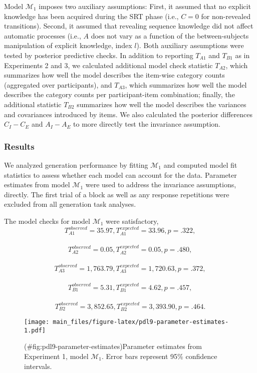 \begin{appendix}
Model \(\mathcal{M}_1\) imposes two auxiliary assumptions: First, it
assumed that no explicit knowledge has been acquired during the SRT
phase (i.e., \(C=0\) for non-revealed transitions). Second, it assumed
that revealing sequence knowledge did not affect automatic processes
(i.e., \(A\) does not vary as a function of the between-subjects
manipulation of explicit knowledge, index \(l\)). Both auxiliary
assumptions were tested by posterior predictive checks. In addition to
reporting \(T_{A1}\) and \(T_{B1}\) as in Experiments 2 and 3, we
calculated additional model check statistic \(T_{A2}\), which summarizes
how well the model describes the item-wise category counts (aggregated
over participants), and \(T_{A3}\), which summarizes how well the model
describes the category counts per participant-item combination; finally,
the additional statistic \(T_{B2}\) summarizes how well the model
describes the variances and covariances introduced by items. We also
calculated the posterior differences \(C_I - C_E\) and \(A_I - A_E\) to
more directly test the invariance assumption.

\subsubsection{Results}\label{results}

We analyzed generation performance by fitting \(\mathcal{M}_1\) and
computed model fit statistics to assess whether each model can account
for the data. Parameter estimates from model \(\mathcal{M}_1\) were used
to address the invariance assumptions, directly. The first trial of a
block as well as any response repetitions were excluded from all
generation task analyses.

The model checks for model \(\mathcal{M}_1\) were satisfactory,
\[T_{A1}^{observed} = 35.97, T_{A1}^{expected} = 33.96, p = .322,\]~
\[T_{A2}^{observed} = 0.05, T_{A2}^{expected} = 0.05, p = .480,\]~
\[T_{A3}^{observed} = 1,763.79, T_{A3}^{expected} = 1,720.63, p = .372,\]~
\[T_{B1}^{observed} = 5.31, T_{B1}^{expected} = 4.62, p = .457,\]~
\[T_{B2}^{observed} = 3,852.65, T_{B2}^{expected} = 3,393.90, p = .464.\]

\begin{figure}
\centering
\texttt{[image: main\_files/figure-latex/pdl9-parameter-estimates-1.pdf]}
\caption{(\#fig:pdl9-parameter-estimates)Parameter estimates from
Experiment 1, model \(\mathcal{M}_1\). Error bars represent 95\%
confidence intervals.}
\end{figure}


\end{appendix}
